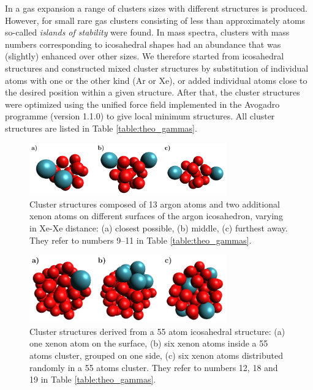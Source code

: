 In a gas expansion a range of clusters sizes with different structures is produced. 
However, for small rare gas clusters consisting of less than approximately \unit[1000]{atoms} so-called \emph{islands of stability} were found.\cite{haberland}  
In mass spectra, clusters with mass numbers corresponding to icosahedral shapes had an abundance that was (slightly) enhanced over other sizes. 
We therefore started from icosahedral structures and constructed mixed cluster structures by substitution of individual atoms with one or the other kind (Ar or Xe), or added individual atoms close to the desired position within a given structure. 
After that, the cluster structures were optimized using the unified force
field implemented in the 
Avogadro programme (version 1.1.0) \cite{Avogadro,Hanwell12} to give local
minimum structures.
All cluster structures are listed in Table \ref{table:theo_gammas}.
%
\begin{figure}[ht]
 \centering
 \includegraphics[width=8.5cm]{pics/cluster_2_overview.pdf}
 \caption{Cluster structures composed of 13 argon atoms and two additional xenon
          atoms on different surfaces of the argon icosahedron, varying in Xe-Xe distance:
          (a) closest possible, (b) middle, (c) furthest away. They refer to
          numbers 9--11 in Table \ref{table:theo_gammas}.}
 \label{figure:cluster_2_overview}
\end{figure}
%
\begin{figure}[h]
 \centering
 \includegraphics[width=8.5cm]{pics/cluster_3_overview.pdf}
 \caption{Cluster structures derived from a 55 atom icosahedral structure:
          (a) one xenon atom on the surface, (b) six xenon atoms inside a 55 atoms cluster,
          grouped on one side, (c) six xenon atoms distributed randomly
          in a 55 atoms cluster. They refer to numbers 12, 18 and 19
          in Table \ref{table:theo_gammas}.}
 \label{figure:cluster_3_overview}
\end{figure}

